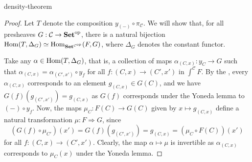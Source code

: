 \begin{example}{density-theorem}
    \begin{proof}
        Let $T$ denote the composition $y_{(-)} \circ \pi_\mathcal{C}$. We will show that, for all presheaves $G : \mathcal{C} \to \textbf{Set}^\textup{op}$, there is a natural bijection $\operatorname{Hom}(T, \Delta_G) \simeq \operatorname{Hom}_{\textbf{Set}^{\mathcal{C}^\textup{op}}}(F, G)$, where $\Delta_G$ denotes the constant functor.
        
        Take any $\alpha \in \operatorname{Hom}(T, \Delta_G)$, that is, a collection of maps $\alpha_{(C, x)} : y_C \to G$ such that $\alpha_{(C, x)} = \alpha_{(C', x')} \circ y_f$ for all $f : (C, x) \to (C', x')$ in $\int^\mathcal{C} F$. By the , every $\alpha_{(C, x)}$ corresponds to an element $g_{(C, x)} \in G(C)$, and we have $G(f)(g_{(C', x')}) = g_{(C, x)}$ as $G(f)$ corresponds under the Yoneda lemma to $(-) \circ y_f$. Now, the maps $\mu_C : F(C) \to G(C)$ given by $x \mapsto g_{(C, x)}$ define a natural transformation $\mu : F \Rightarrow G$, since
        \[ (G(f) \circ \mu_{C'})(x') = G(f)(g_{(C', x')}) = g_{(C, x)} = (\mu_C \circ F(C))(x') \]
        for all $f : (C, x) \to (C', x')$. Clearly, the map $\alpha \mapsto \mu$ is invertible as $\alpha_{(C, x)}$ corresponds to $\mu_C(x)$ under the Yoneda lemma.
    \end{proof}
\end{example}

